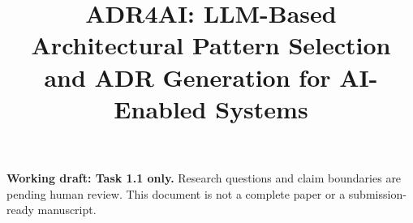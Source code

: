 \documentclass[10pt,conference]{IEEEtran}
\title{ADR4AI: LLM-Based Architectural Pattern Selection and ADR Generation for AI-Enabled Systems}
\author{\IEEEauthorblockN{Anonymous Authors}}
\begin{document}
\maketitle
\noindent\textbf{Working draft: Task 1.1 only.}
Research questions and claim boundaries are pending human review.
This document is not a complete paper or a submission-ready manuscript.


\end{document}
